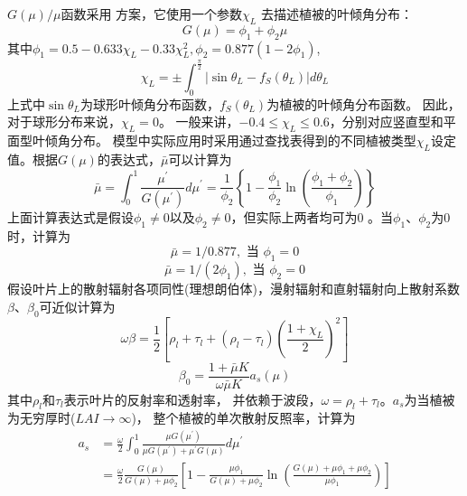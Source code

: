 $G(\mu) / \mu$函数采用 \citet{goudriaan1977crop} 方案，它使用一个参数$\chi_{L}  $\citep{ross1975radiative} 去描述植被的叶倾角分布：
\begin{equation}\label{Gmu}
G(\mu)=\phi_{1}+\phi_{2} \mu
\end{equation}
其中$\phi_{1}=0.5-0.633 \chi_{L}-0.33 \chi_{L}^{2}, \phi_{2}=0.877\left(1-2 \phi_{1}\right)$,
\begin{equation}
\chi_{L}=\pm \int_{0}^{\frac{\pi}{2}}\left|\sin \theta_{L}-f_{S}\left(\theta_{L}\right)\right| d \theta_{L}
\end{equation}
上式中$\sin \theta_{L}$为球形叶倾角分布函数，$f_{S}\left(\theta_{L}\right)$为植被的叶倾角分布函数。
因此，对于球形分布来说，$\chi_{L}=0$。 一般来讲，$-0.4≤\chi_{L}≤0.6$，分别对应竖直型和平面型叶倾角分布。
模型中实际应用时采用通过查找表得到的不同植被类型$\chi_{L}$设定值。根据$G(\mu)$的表达式，$\bar{\mu}$可以计算为
\begin{equation}
\bar{\mu}=\int_{0}^{1} \frac{\mu^{\prime}}{G\left(\mu^{\prime}\right)}
 d \mu^{\prime}=\frac{1}{\phi_{2}}\left\{1-\frac{\phi_{1}}{\phi_{2}}
 \ln \left(\frac{\phi_{1}+\phi_{2}}{\phi_{1}}\right)\right\}
\end{equation}
上面计算表达式是假设$\phi_{1} \neq 0$以及$\phi_{2} \neq 0$，但实际上两者均可为0 \citep{dai2004two}。当$\phi_{1}$、$\phi_{2}$为0时，计算为
\begin{equation}
\bar{\mu}=1 / 0.877, \text { 当 } \phi_{1}=0
\end{equation}
\begin{equation}
\bar{\mu}=1 /\left(2 \phi_{1}\right), \text { 当 } \phi_{2}=0
\end{equation}
假设叶片上的散射辐射各项同性(理想朗伯体)，漫射辐射和直射辐射向上散射系数$\beta$、$\beta_0$可近似计算为
\begin{equation}
\omega \beta=\frac{1}{2}\left[\rho_{l}+\tau_{l}+\left(\rho_{l}-\tau_{l}\right)\left(\frac{1+\chi_{L}}{2}\right)^{2}\right]
\end{equation}
\begin{equation}\label{beta0}
\beta_{0}=\frac{1+\bar{\mu} K}{\omega \bar{\mu} K} a_{s}(\mu)
\end{equation}
其中$\rho_l$和$\tau_l$表示叶片的反射率和透射率，
并依赖于波段，$\omega=\rho_l+\tau_l$。$a_s$为当植被为无穷厚时($LAI\rightarrow\infty$)，
整个植被的单次散射反照率，计算为
\begin{equation}
\begin{aligned} a_{s} &=\frac{\omega}{2} \int_{0}^{1} \frac{\mu G\left(\mu^{\prime}\right)}{\mu G\left(\mu^{\prime}\right)+\mu^{\prime} 
G(\mu)} d \mu^{\prime} \\ &=\frac{\omega}{2} \frac{G(\mu)}{G(\mu)+\mu \phi_{2}}\left[1-\frac{\mu \phi_{1}}{G(\mu)+\mu \phi_{2}} 
\ln \left(\frac{G(\mu)+\mu \phi_{1}+\mu \phi_{2}}{\mu \phi_{1}}\right)\right] \end{aligned}
\end{equation}
